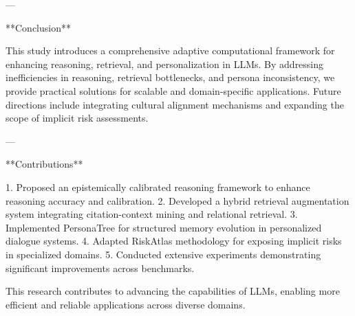 ---

**Conclusion**  

This study introduces a comprehensive adaptive computational framework for enhancing reasoning, retrieval, and personalization in LLMs. By addressing inefficiencies in reasoning, retrieval bottlenecks, and persona inconsistency, we provide practical solutions for scalable and domain-specific applications. Future directions include integrating cultural alignment mechanisms and expanding the scope of implicit risk assessments.

---

**Contributions**  

1. Proposed an epistemically calibrated reasoning framework to enhance reasoning accuracy and calibration.  
2. Developed a hybrid retrieval augmentation system integrating citation-context mining and relational retrieval.  
3. Implemented PersonaTree for structured memory evolution in personalized dialogue systems.  
4. Adapted RiskAtlas methodology for exposing implicit risks in specialized domains.  
5. Conducted extensive experiments demonstrating significant improvements across benchmarks.  

This research contributes to advancing the capabilities of LLMs, enabling more efficient and reliable applications across diverse domains.